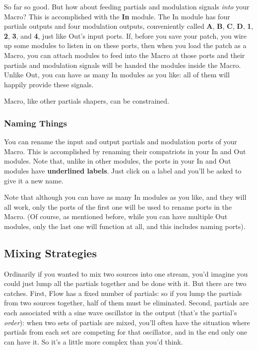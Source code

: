 \documentclass{article}
\newcommand\name{Flow}
\begin{document}
So far so good.  But how about feeding partials and modulation signals {\it into} your Macro?  This is accomplished with the {\bf In} module.  The In module has four partials outputs and four modulation outputs, conveniently called {\bf A}, {\bf B}, {\bf C}, {\bf D}, {\bf 1}, {\bf 2}, {\bf 3}, and {\bf 4}, just like Out's input ports.  If, before you save your patch, you wire up some modules to listen in on these ports, then when you load the patch as a Macro, you can attach modules to feed into the Macro at those ports and their partials and modulation signals will be handed the modules inside the Macro.  Unlike Out, you can have as many In modules as you like: all of them will happily provide these signals.

Macro, like other partials shapers, can be constrained.

\subsubsection{Naming Things}

You can rename the input and output partials and modulation ports of your Macro.  This is accomplished by renaming their compatriots in your In and Out modules.  Note that, unlike in other modules, the ports in your In and Out modules have {\bf underlined labels}.  Just click on a label and you'll be asked to give it a new name.

Note that although you can have as many In modules as you like, and they will all work, only the ports of the first one will be used to rename ports in the Macro.  (Of course, as mentioned before, while you can have multiple Out modules, only the last one will function at all, and this includes naming ports).

\subsection{Mixing Strategies}
\label{mixingstrategies}

Ordinarily if you wanted to mix two sources into one stream, you'd imagine you could just lump all the partials together and be done with it.  But there are two catches.  First, {\name} has a fixed number of partials: so if you lump the partials from two sources together, half of them must be eliminated.  Second, partials are each associated with a sine wave oscillator in the output (that's the partial's {\it order}): when two sets of partials are mixed, you'll often have the situation where partials from each set are competing for that oscillator, and in the end only one can have it.  So it's a little more complex than you'd think.
\end{document}
